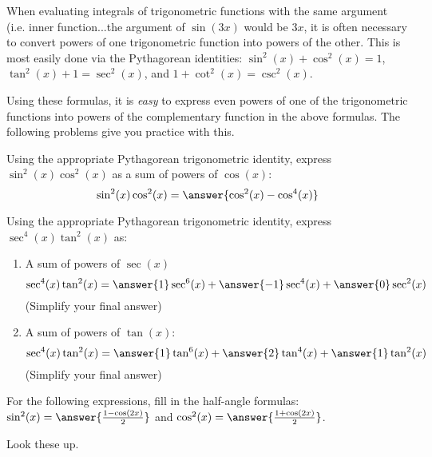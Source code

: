 \documentclass{ximera}
\author{}
\begin{document}
\begin{exercise}

  When evaluating integrals of trigonometric functions with the same argument (i.e. inner function...the argument of $\sin(3x)$ would be $3x$, it is often necessary to convert powers of one trigonometric function into powers of the other.
    This is most easily done via the Pythagorean identities: $\sin^2(x) + \cos^2(x) = 1$, $\tan^2(x) + 1 = \sec^2(x)$, and $1 + \cot^2(x) = \csc^2(x)$.
    
    Using these formulas, it is \emph{easy} to express even powers of one of the trigonometric functions into powers of the complementary function in the above formulas.
    The following problems give you practice with this.
    \begin{problem}
      
  \begin{multipleChoice}
  \end{multipleChoice}
    \end{problem}
\begin{problem}
  Using the appropriate Pythagorean trigonometric identity, express $\sin^2(x) \cos^2(x)$ as a sum of powers of $\cos(x)$:
  \[
    \sin^2(x) \cos^2(x) = \answer{\cos^2(x) - \cos^4(x)}
  \]
\end{problem}

\begin{problem}
  Using the appropriate Pythagorean trigonometric identity, express $\sec^4(x) \tan^2(x)$ as:
  \begin{enumerate}
    \item A sum of powers of $\sec(x)$
      \[
        \sec^4(x) \tan^2(x) = \answer{1}\sec^6(x) + \answer{-1}\sec^4(x)+\answer{0}\sec^2(x)
      \]
      (Simplify your final answer)
    \item A sum of powers of $\tan(x)$:
      \[
        \sec^4(x) \tan^2(x) = \answer{1}\tan^6(x) + \answer{2}\tan^4(x) + \answer{1}\tan^2(x)
      \]
      (Simplify your final answer)
  \end{enumerate}
\end{problem}

\begin{problem}
  For the following expressions, fill in the half-angle formulas:
  $\sin^2(x) = \answer{\frac{1 - \cos(2x)}{2}}$ and $\cos^2(x) = \answer{\frac{1 + \cos(2x)}{2}}$.  
  
  \begin{hint}
    Look these up.
  \end{hint}
\end{problem}



\end{exercise}
\end{document}
